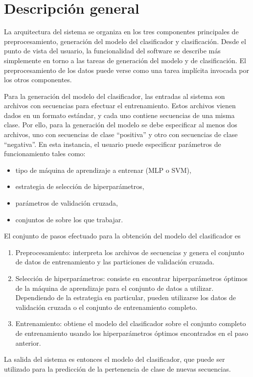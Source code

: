 %
%
%
\section{Descripción general}
%
La arquitectura del sistema se organiza en los tres componentes
principales de preprocesamiento, generación del modelo del
clasificador y clasificación. Desde el punto de vista del usuario, la
funcionalidad del software se describe más simplemente en torno a las
tareas de generación del modelo y de clasificación. El
preprocesamiento de los datos puede verse como una tarea implícita
invocada por los otros componentes.

Para la generación del modelo del clasificador, las entradas al
sistema son archivos con secuencias para efectuar el entrenamiento.
Estos archivos vienen dados en un formato estándar, y cada uno
contiene secuencias de una misma clase. Por ello, para la generación
del modelo se debe especificar al menos dos archivos, uno con
secuencias de clase ``positiva'' y otro con secuencias de clase
``negativa''. En esta instancia, el usuario puede especificar
parámetros de funcionamiento tales como:
%
\begin{itemize}
\item tipo de máquina de aprendizaje a entrenar (MLP o SVM),
\item estrategia de selección de hiperparámetros,
\item parámetros de validación cruzada,
\item conjuntos de  sobre los que trabajar.
\end{itemize}
%
El conjunto de pasos efectuado para la obtención del modelo del
clasificador es
%
\begin{enumerate}
\item Preprocesamiento: interpreta los archivos de secuencias y
  genera el conjunto de datos de entrenamiento y las particiones de
  validación cruzada.
\item Selección de hiperparámetros: consiste en encontrar
  hiperparámetros óptimos de la máquina de aprendizaje para el
  conjunto de datos a utilizar. Dependiendo de la estrategia en
  particular, pueden utilizarse los datos de validación cruzada o el
  conjunto de entrenamiento completo.
\item Entrenamiento: obtiene el modelo del clasificador sobre el
  conjunto completo de entrenamiento usando los hiperparámetros
  óptimos encontrados en el paso anterior.
\end{enumerate}
%
La salida del sistema es entonces el modelo del clasificador, que
puede ser utilizado para la predicción de la pertenencia de clase de
nuevas secuencias.

